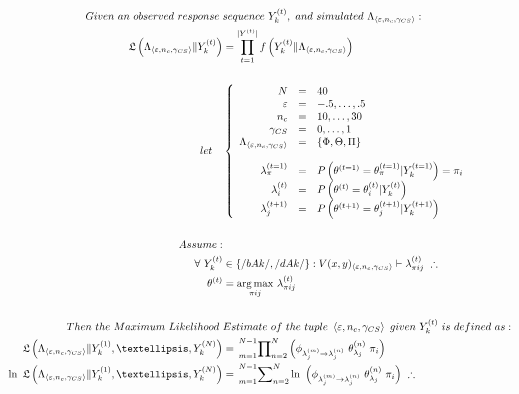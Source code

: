 \documentclass[10pt]{article}
\begin{document}
\begin{align*}
Given\ an\ observed\ response\ & sequence\ Y_k^{(t)},\ and\ simulated\ \Lambda_{\left\langle \varepsilon,n_c,\gamma_{CS} \right\rangle}:\\
\mathfrak{L} \left(\Lambda_{\left\langle \varepsilon,n_c,\gamma_{CS} \right\rangle}\Vert Y_{k}^{(t)} \right) &= \prod_{t=1}^{|Y^{(t)}|} f \left(Y_{k}^{(t)}\Vert\Lambda_{\left\langle \varepsilon,n_c,\gamma_{CS}\right\rangle} \right)\\
\\
let\ \ \ &\left\{ {\scriptstyle \begin{array}{ r c l } 
N &=& 40 \\ 
\varepsilon &=& -.5,\ldots,.5 \\
n_c &=& 10,\ldots,30 \\
\gamma_{CS} &=& 0,\ldots,1 \\
\Lambda_{\left\langle \varepsilon,n_c,\gamma_{CS} \right\rangle} &=& \{\Phi,\Theta,\Pi\}\\
 & &\\ 
\lambda_{\pi}^{(t=1)} &=& P\left(\theta^{(t=1)}=\theta_{\pi}^{(t=1)} |Y_{k}^{(t=1)}\right)=\pi_i\\
\lambda_{i}^{(t)}&=& P\left(\theta^{(t)}=\theta_{i}^{(t)} |Y_{k}^{(t)}\right) \\
\lambda_{j}^{(t+1)}&=& P\left(\theta^{(t+1)}=\theta_{j}^{(t+1)} |Y_{k}^{(t+1)}\right) \\
\end{array}} \right. \\
\\
Assume:\\
\forall \ Y_k^{(t)} &\in \{/bAk/,/dAk/\} : V(x,y)_{\left\langle \varepsilon,n_c,\gamma_{CS}\right\rangle} \vdash \lambda_{\pi ij}^{(t)}\ \therefore\\
\theta^{(t)} &= \underset{\pi ij}{\operatorname{arg\,max}}\ \lambda_{\pi ij}^{(t)}\\
\\
Then\ the\ Maximum\ Likelihood\ & Estimate\ of\ the\ tuple\ \left\langle \varepsilon,n_c,\gamma_{CS} \right\rangle\ given\ Y_k^{(t)}\ is\ defined\ as:\\
\mathfrak{L} \left(\Lambda_{\left\langle \varepsilon,n_c,\gamma_{CS}\right\rangle} \Vert Y_{k}^{(1)},…,Y_{k}^{(N)} \right) &= \sideset{_{m=1}^{N-1}}{_{n=2}^{N}}\prod \left(\phi_{\lambda_j^{(m)} \rightarrow \lambda_j^{(n)}}\ \theta_{\lambda_{j}}^{(n)}\ \pi_i \right)
\\  
\ln\ \mathfrak{L} \left(\Lambda_{\left\langle \varepsilon,n_c,\gamma_{CS}\right\rangle} \Vert Y_{k}^{(1)},…,Y_{k}^{(N)} \right) &=\sideset{_{m=1}^{N-1}}{_{n=2}^{N}}\sum \ln\  \left(\phi_{\lambda_j^{(m)} \rightarrow \lambda_j^{(n)}}\ \theta_{\lambda_{j}}^{(n)}\ \pi_i \right)\ \therefore\\

\end{align*}
\end{document}

